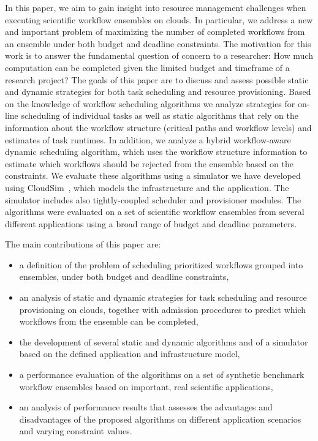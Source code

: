 \documentclass{sig-alternate}
\begin{document}
In this paper, we aim to gain insight into resource management challenges when executing 
scientific workflow ensembles on clouds. In particular, we address a new and important 
problem of maximizing the number of completed workflows from an ensemble under both budget and
deadline constraints. The motivation for this work is to answer the fundamental question of 
concern to a researcher: How much computation can be completed given the limited budget and 
timeframe of a research project? The goals of this paper are to discuss and assess possible
static and dynamic strategies for both task scheduling and resource
provisioning. Based on the knowledge of workflow scheduling algorithms we
analyze strategies for on-line scheduling of individual tasks as well as static
algorithms that rely on the information about the workflow structure (critical
paths and workflow levels) and estimates of task runtimes. In addition, we
analyze a hybrid workflow-aware dynamic scheduling algorithm, which uses the
workflow structure information to estimate which workflows should be rejected
from the ensemble based on the constraints. We evaluate these algorithms using a
simulator we have developed using CloudSim~\cite{Calheiros11}, which models the 
infrastructure and the application. The simulator includes also tightly-coupled 
scheduler and provisioner modules. The algorithms were evaluated on a set 
of scientific workflow ensembles from several different applications using a 
broad range of budget and deadline parameters. 

The main contributions of this paper are:
\begin{itemize}
  \item a definition of the problem of scheduling prioritized workflows grouped into
  ensembles, under both budget and deadline constraints,
  \item an analysis of static and dynamic strategies for task scheduling and
  resource provisioning on clouds, together with admission procedures to
  predict which workflows from the ensemble can be completed,
  \item the development of several static and dynamic algorithms and of a simulator based
  on the defined application and infrastructure model,
  \item a performance evaluation of the algorithms on a set of synthetic benchmark
  workflow ensembles based on important, real scientific applications,
  \item an analysis of performance results that assesses the advantages and
  disadvantages of the proposed algorithms on different application scenarios and
  varying constraint values.
\end{itemize}
\end{document}
